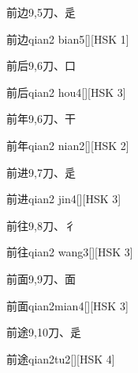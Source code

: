\begin{entry}{前边}{9,5}{⼑、⾡}
  \begin{phonetics}{前边}{qian2 bian5}[][HSK 1]
  \end{phonetics}
\end{entry}

\begin{entry}{前后}{9,6}{⼑、⼝}
  \begin{phonetics}{前后}{qian2 hou4}[][HSK 3]
  \end{phonetics}
\end{entry}

\begin{entry}{前年}{9,6}{⼑、⼲}
  \begin{phonetics}{前年}{qian2 nian2}[][HSK 2]
  \end{phonetics}
\end{entry}

\begin{entry}{前进}{9,7}{⼑、⾡}
  \begin{phonetics}{前进}{qian2 jin4}[][HSK 3]
  \end{phonetics}
\end{entry}

\begin{entry}{前往}{9,8}{⼑、⼻}
  \begin{phonetics}{前往}{qian2 wang3}[][HSK 3]
  \end{phonetics}
\end{entry}

\begin{entry}{前面}{9,9}{⼑、⾯}
  \begin{phonetics}{前面}{qian2mian4}[][HSK 3]
  \end{phonetics}
\end{entry}

\begin{entry}{前途}{9,10}{⼑、⾡}
  \begin{phonetics}{前途}{qian2tu2}[][HSK 4]
  \end{phonetics}
\end{entry}

